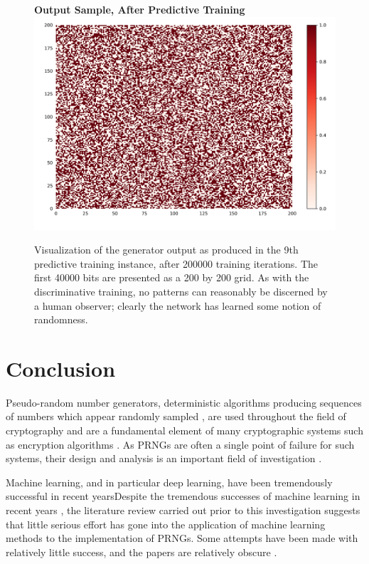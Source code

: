 \documentclass[12pt, titlepage]{report}
\theoremstyle{definition}
\begin{document}
\begin{figure}
\centering
\textbf{Output Sample, After Predictive Training}
\includegraphics[width=1\textwidth]{img/predictive_after}\\
\caption{Visualization of the generator output as produced in the 9th predictive training instance, after 200000 training iterations. The first 40000 bits are presented as a 200 by 200 grid. As with the discriminative training, no patterns can reasonably be discerned by a human observer; clearly the network has learned some notion of randomness.}
\label{figure:visualize_predictive_after}
\end{figure}



\chapter{Conclusion}\label{chapter:conclusion}
Pseudo-random number generators, deterministic algorithms producing sequences of numbers which appear randomly sampled \cite[p. 7]{barker2007recommendation}, are used throughout the field of cryptography and are a fundamental element of many cryptographic systems such as encryption algorithms  \cite[p. 169]{menezes1996handbook} \cite[p. 1]{kelsey1998cryptanalytic}. As PRNGs are often a single point of failure for such systems, their design and analysis is an important field of investigation \cite[p. 2]{kelsey1998cryptanalytic} \cite{deng2017developments}. 

Machine learning, and in particular deep learning, have been tremendously successful in recent yearsDespite the tremendous successes of machine learning in recent years \cite[p. 24-29]{russel2009artificial}, the literature review carried out prior to this investigation suggests that little serious effort has gone into the application of machine learning methods to the implementation of PRNGs. Some attempts have been made with relatively little success, and the papers are relatively obscure \cite{desai2011pseudo} \cite{desai2012pseudo} \cite{tirdad2010hopfield}.
\end{document}
